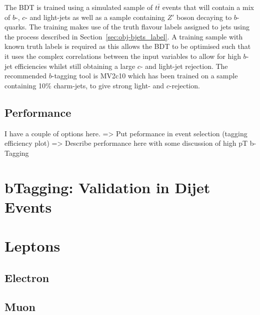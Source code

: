 The BDT is trained using a simulated sample of $t\bar{t}$ events that will contain a mix of  $b$-, $c$- and light-jets
as well as a sample containing $Z'$ boson decaying to $b$-quarks.
The training makes use of the truth flavour labels assigned to jets using the process described in Section~\ref{sec:obj-bjets_label}.
A training sample with known truth labels is required as this allows the BDT to be optimised
such that it uses the complex correlations between the input variables to allow for high $b$-jet efficiencies
whilst still obtaining a large $c$- and light-jet rejection.
The recommended $b$-tagging tool is MV2c10 which has been trained on a sample containing 10\% charm-jets, to give strong light- and $c$-rejection.

\subsection{Performance}

I have a couple of options here.
=> Put peformance in event selection (tagging efficiency plot)
=> Describe performance here with some discussion of high pT b-Tagging

\section{bTagging: Validation in Dijet Events}

\section{Leptons}   
\subsection{Electron}
\label{sec:obj-electron}
\subsection{Muon}
\label{sec:obj-muon}

